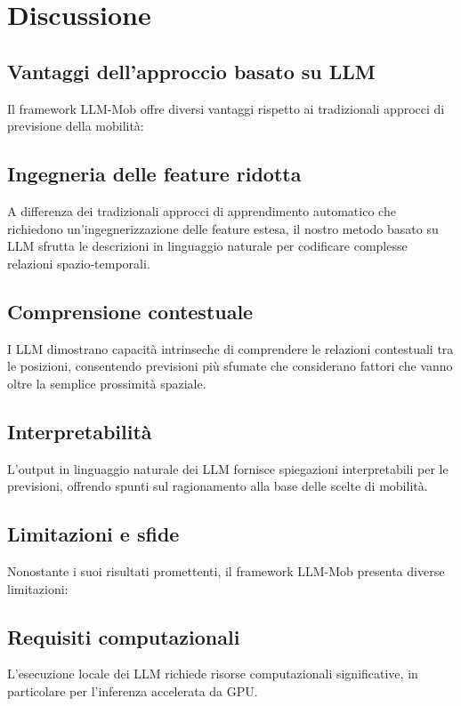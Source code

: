 \section{Discussione}

\subsection{Vantaggi dell'approccio basato su LLM}

Il framework LLM-Mob offre diversi vantaggi rispetto ai tradizionali approcci di previsione della mobilità:

\subsection{Ingegneria delle feature ridotta}
A differenza dei tradizionali approcci di apprendimento automatico che richiedono un'ingegnerizzazione delle feature estesa, il nostro metodo basato su LLM sfrutta le descrizioni in linguaggio naturale per codificare complesse relazioni spazio-temporali.

\subsection{Comprensione contestuale}
I LLM dimostrano capacità intrinseche di comprendere le relazioni contestuali tra le posizioni, consentendo previsioni più sfumate che considerano fattori che vanno oltre la semplice prossimità spaziale.

\subsection{Interpretabilità}
L'output in linguaggio naturale dei LLM fornisce spiegazioni interpretabili per le previsioni, offrendo spunti sul ragionamento alla base delle scelte di mobilità.

\subsection{Limitazioni e sfide}

Nonostante i suoi risultati promettenti, il framework LLM-Mob presenta diverse limitazioni:

\subsection{Requisiti computazionali}
L'esecuzione locale dei LLM richiede risorse computazionali significative, in particolare per l'inferenza accelerata da GPU.

